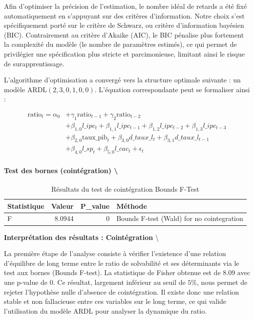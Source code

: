 \documentclass[
]{article}
\begin{document}
Afin d'optimiser la précision de l'estimation, le nombre idéal de
retards a été fixé automatiquement en s'appuyant sur des critères
d'information. Notre choix s'est spécifiquement porté sur le critère de
Schwarz, ou critère d'information bayésien (BIC). Contrairement au
critère d'Akaike (AIC), le BIC pénalise plus fortement la complexité du
modèle (le nombre de paramètres estimés), ce qui permet de privilégier
une spécification plus stricte et parcimonieuse, limitant ainsi le
risque de surapprentissage.

L'algorithme d'optimisation a convergé vers la structure optimale
suivante : un modèle \(\text{ARDL}(2, 3, 0, 1, 0, 0)\). L'équation
correspondante peut se formaliser ainsi :

\[\begin{aligned}
\text{ratio}_t = \alpha_0 & + \gamma_1 \text{ratio}_{t-1} + \gamma_2 \text{ratio}_{t-2} \\
& + \beta_{1,0} l\_ipc_t + \beta_{1,1} l\_ipc_{t-1} + \beta_{1,2} l\_ipc_{t-2} + \beta_{1,3} l\_ipc_{t-3} \\
& + \beta_{2,0} \text{taux\_pib}_t + \beta_{3,0} d\_taux\_l_t + \beta_{3,1} d\_taux\_l_{t-1} \\
& + \beta_{4,0} l\_sp_t + \beta_{5,0} l\_cac_t + \epsilon_t
\end{aligned}\]

\paragraph{Test des bornes (cointégration)
\textbackslash{}}\label{test-des-bornes-cointuxe9gration}

\begin{table}[!h]
\centering
\caption{\label{tab:cointégration}Résultats du test de cointégration Bounds F-Test}
\centering
\begin{tabular}[t]{lrrl}
\toprule
Statistique & Valeur & P\_value & Méthode\\
\midrule
F & 8.0944 & 0 & Bounds F-test (Wald) for no cointegration\\
\bottomrule
\end{tabular}
\end{table}

\textbf{Interprétation des résultats : Cointégration} \textbackslash{}

La première étape de l'analyse consiste à vérifier l'existence d'une
relation d'équilibre de long terme entre le ratio de solvabilité et ses
déterminants via le test aux bornes (Bounds F-test). La statistique de
Fisher obtenue est de 8.09 avec une p-value de 0. Ce résultat, largement
inférieur au seuil de \(5 \%\), nous permet de rejeter l'hypothèse nulle
d'absence de cointégration. Il existe donc une relation stable et non
fallacieuse entre ces variables sur le long terme, ce qui valide
l'utilisation du modèle ARDL pour analyser la dynamique du ratio.
\end{document}
